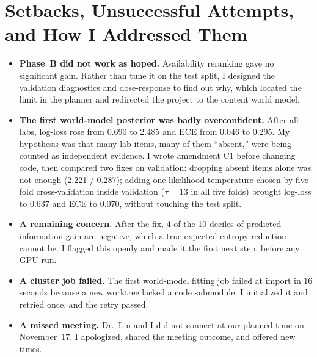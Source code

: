 \documentclass[11pt,letterpaper]{article}
\begin{document}
\section{Setbacks, Unsuccessful Attempts, and How I Addressed Them}
\begin{itemize}
  \item \textbf{Phase~B did not work as hoped.} Availability reranking gave no significant gain. Rather than tune it on the test split, I designed the validation diagnostics and dose-response to find out why, which located the limit in the planner and redirected the project to the content world model.
  \item \textbf{The first world-model posterior was badly overconfident.} After all labs, log-loss rose from 0.690 to 2.485 and ECE from 0.046 to 0.295. My hypothesis was that many lab items, many of them ``absent,'' were being counted as independent evidence. I wrote amendment C1 before changing code, then compared two fixes on validation: dropping absent items alone was not enough (2.221 / 0.287); adding one likelihood temperature chosen by five-fold cross-validation inside validation ($\tau = 13$ in all five folds) brought log-loss to 0.637 and ECE to 0.070, without touching the test split.
  \item \textbf{A remaining concern.} After the fix, 4 of the 10 deciles of predicted information gain are negative, which a true expected entropy reduction cannot be. I flagged this openly and made it the first next step, before any GPU run.
  \item \textbf{A cluster job failed.} The first world-model fitting job failed at import in 16 seconds because a new worktree lacked a code submodule. I initialized it and retried once, and the retry passed.
  \item \textbf{A missed meeting.} Dr.~Liu and I did not connect at our planned time on November~17. I apologized, shared the meeting outcome, and offered new times.
\end{itemize}
\end{document}
